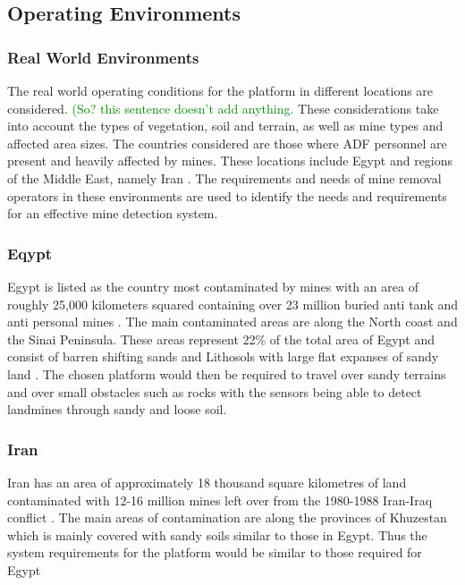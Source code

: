 \documentclass[main.tex]{subfiles}
\begin{document}
\subsection{Operating Environments}
\subsubsection{Real World Environments}
The real world operating conditions for the platform in different locations are considered. \textcolor{green}{(So? this sentence doesn't add anything.} These considerations take into account the types of vegetation, soil and terrain, as well as mine types and affected area sizes. The countries considered are those where ADF personnel are present and heavily affected by mines. These locations include Egypt and regions of the Middle East, namely Iran \parencite{AustralianGovernment2016}. The requirements and needs of mine removal operators in these environments are used to identify the needs and requirements for an effective mine detection system.

\subsubsection{Eqypt}
Egypt is listed as the country most contaminated by mines with an area of roughly 25,000 kilometers squared containing over 23 million buried anti tank and anti personal mines \parencite{Rushfan2008}. The main contaminated areas are along the North coast and the Sinai Peninsula. These areas represent 22\% of the total area of Egypt and consist of barren shifting sands and Lithosols with large flat expanses of sandy land \parencite{Nahrawy2011}. 
 The chosen platform would then be required to travel over sandy terrains and over small obstacles such as rocks with the sensors being able to detect landmines through sandy and loose soil. 
 \subsubsection{Iran}
 Iran has an area of approximately 18 thousand square kilometres of land contaminated with 12-16 million mines left over from the 1980-1988 Iran-Iraq conflict \parencite{landmineMonitor2015}. The main areas of contamination are along the provinces of Khuzestan which is mainly covered with sandy soils similar to those in Egypt. Thus the system requirements for the platform would be similar to those required for Egypt
\end{document}
